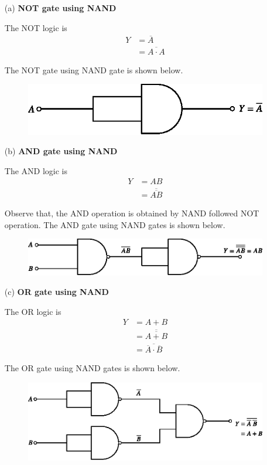 \begin{solution}
\begin{itemize}
\item[(a)] {\bf NOT gate using NAND}

The NOT logic is
\begin{align*}
Y &= \overline{A}\\[3pt]
&= \overline{A\cdot A}
\end{align*}

\eject

The NOT gate using NAND gate is shown below.
\begin{figure}[H]
\centering
\includegraphics{chap6/fig98.eps}
\end{figure}

\item[(b)] {\bf AND gate using NAND}

The AND logic is
\begin{align*}
Y &= AB\\[3pt]
  &= \overline{\overline{AB}}
\end{align*}

Observe that, the AND operation is obtained by NAND followed NOT operation. The AND gate using NAND gates is shown below.
\begin{figure}[H]
\centering
\includegraphics{chap6/fig99.eps}
\end{figure}

\item[(c)] {\bf OR gate using NAND}

The OR logic is
\begin{align*}
Y &= A+B\\[3pt]
&= \overline{\overline{A+B}}\\[3pt]
&= \overline{\overline{A}\cdot \overline{B}}
\end{align*}

The OR gate using NAND gates is shown below.
\begin{figure}[H]
\centering
\includegraphics{chap6/fig100.eps}
\end{figure}


\end{itemize}
\end{solution}
